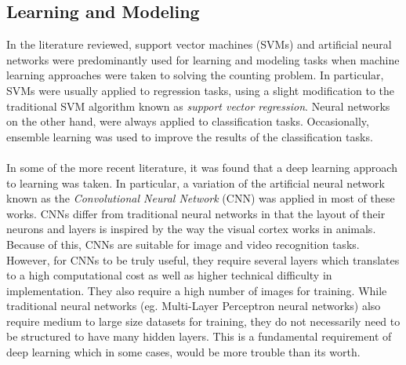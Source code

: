 \subsection{Learning and Modeling}
In the literature reviewed, support vector machines (SVMs) and artificial neural networks were predominantly used for learning and modeling tasks when machine learning approaches were taken to solving the counting problem. In particular, SVMs were usually applied to regression tasks, using a slight modification to the traditional SVM algorithm known as \textit{support vector regression}. Neural networks on the other hand, were always applied to classification tasks. Occasionally, ensemble learning was used to improve the results of the classification tasks.\\ \\
%
In some of the more recent literature, it was found that a deep learning approach to learning was taken. In particular, a variation of the artificial neural network known as the \textit{Convolutional Neural Network} (CNN) was applied in most of these works. CNNs differ from traditional neural networks in that the layout of their neurons and layers is inspired by the way the visual cortex works in animals. Because of this, CNNs are suitable for image and video recognition tasks. However, for CNNs to be truly useful, they require several layers which translates to a high computational cost as well as higher technical difficulty in implementation. They also require a high number of images for training. While traditional neural networks (eg. Multi-Layer Perceptron neural networks) also require medium to large size datasets for training, they do not necessarily need to be structured to have many hidden layers. This is a fundamental requirement of deep learning which in some cases, would be more trouble than its worth.

